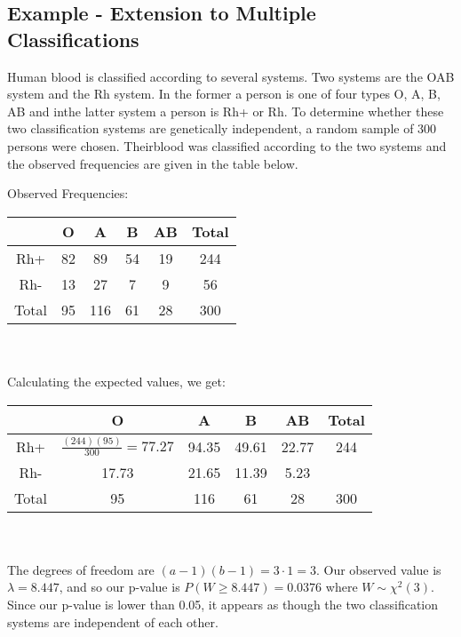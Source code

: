 \documentclass[12pt]{article}
\begin{document}
\subsection{Example - Extension to Multiple Classifications}
Human blood is classified according to several systems.  Two systems are the OAB system and the Rh system. In the former a person is one of four types O, A, B, AB and inthe latter system a person is Rh+ or Rh. To determine whether these two classification systems are genetically independent, a random sample of 300 persons were chosen. Theirblood was classified according to the two systems and the observed frequencies are given in the table below.

\noindent Observed Frequencies:\\
\begin{tabular}{c|cccc|c}
    & O & A & B & AB & Total\\\hline
    Rh+ & 82 & 89 & 54 & 19 & 244\\
    Rh- & 13 & 27 & 7 & 9 & 56\\\hline
    Total & 95 & 116 & 61 & 28 & 300
\end{tabular}\\\\
Calculating the expected values, we get:
\begin{tabular}{c|cccc|c}
    & O & A & B & AB & Total\\\hline
    Rh+ & $\frac{(244)(95)}{300}=77.27$ & 94.35 & 49.61 & 22.77& 244\\
    Rh- & 17.73 & 21.65 & 11.39 & 5.23\\\hline
    Total & 95 & 116 & 61 & 28 & 300
\end{tabular}\\\\
The degrees of freedom are $(a-1)(b-1)=3\cdot 1=3$. Our observed value is $\lambda=8.447$, and so our p-value is $P(W\geq 8.447)=0.0376$ where $W\sim \chi^2(3)$. Since our p-value is lower than 0.05, it appears as though the two classification systems are independent of each other.
\end{document}
